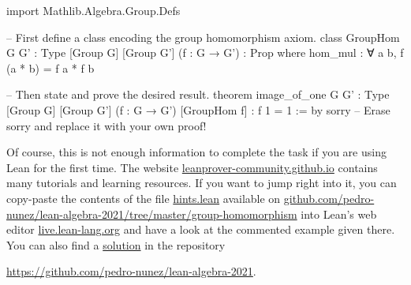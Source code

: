 \documentclass[12pt, a4paper]{article}
\theoremstyle{definition}
\begin{document}
\begin{leancode}
  import Mathlib.Algebra.Group.Defs

  -- First define a class encoding the group homomorphism axiom.
  class GroupHom {G G' : Type} [Group G] [Group G']
    (f : G → G') : Prop where
    hom_mul : ∀ a b, f (a * b) = f a * f b

  -- Then state and prove the desired result.
  theorem image_of_one {G G' : Type} [Group G] [Group G']
    (f : G → G') [GroupHom f] : f 1 = 1 := by
    sorry -- Erase sorry and replace it with your own proof!
\end{leancode}

Of course, this is not enough information to complete the task if you are using Lean for the first time.
The website \href{https://leanprover-community.github.io}{leanprover-community.github.io} contains many tutorials and learning resources.
If you want to jump right into it, you can copy-paste the contents of the file \href{https://github.com/pedro-nunez/lean-algebra-2021/blob/master/group-homomorphism/hints.lean}{hints.lean} available on \href{https://github.com/pedro-nunez/lean-algebra-2021/tree/master/group-homomorphism}{github.com/pedro-nunez/lean-algebra-2021/tree/master/group-homomorphism} into Lean's web editor \href{https://live.lean-lang.org}{live.lean-lang.org} and have a look at the commented example given there.
You can also find a \href{https://github.com/pedro-nunez/lean-algebra-2021/blob/master/group-homomorphism/solution.lean}{solution} in the repository
\begin{center}
  \href{https://github.com/pedro-nunez/lean-algebra-2021}{https://github.com/pedro-nunez/lean-algebra-2021}.
\end{center}

{\renewcommand{\thefootnote}{\fnsymbol{footnote}}}
\end{document}
